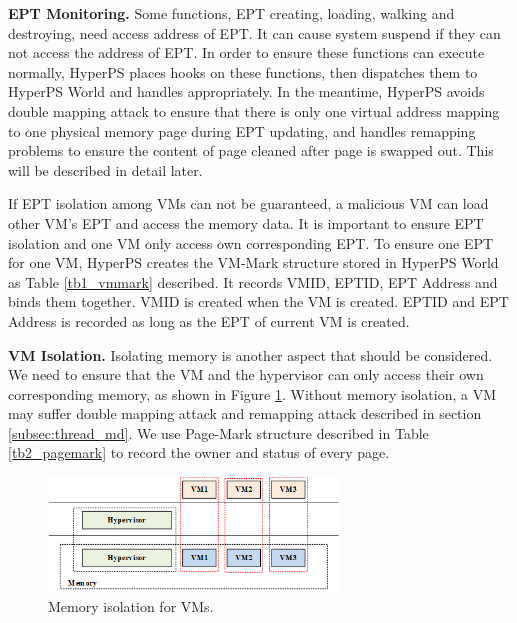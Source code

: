 \documentclass[10pt, numbers, preprint ]{sigplanconf}
\begin{document}
{\textbf{EPT Monitoring.} Some functions, EPT creating, loading, walking and destroying, need access address of EPT. It can cause system suspend if they can not access the address of EPT. In order to ensure these functions can execute normally, HyperPS places hooks on these functions, then dispatches them to HyperPS World and handles appropriately. In the meantime, HyperPS avoids double mapping attack to ensure that there is only one virtual address mapping to one physical memory page during EPT updating, and handles remapping problems to ensure the content of page cleaned after page is swapped out. This will be described in detail later.

If EPT isolation among VMs can not be guaranteed, a malicious VM can load other VM’s EPT and access the memory data. It is important to ensure EPT isolation and one VM only access own corresponding EPT. To ensure one EPT for one VM, HyperPS creates the VM-Mark structure stored in HyperPS World as Table \ref{tb1_vmmark} described. It records VMID, EPTID, EPT Address and binds them together. VMID is created when the VM is created. EPTID and EPT Address is recorded as long as the EPT of current VM is created.

\begin{table}[htbp]
	\centering
	\caption{vm-Mark Table.}
	\label{tb1_vmmark}
\end{table}

\textbf{VM Isolation.} Isolating memory is another aspect that should be considered. We need to ensure that the VM and the hypervisor can only access their own corresponding memory, as shown in Figure \ref{fg6_memiso}. Without memory isolation, a VM may suffer double mapping attack and remapping attack described in section \ref{subsec:thread_md}. We use Page-Mark structure described in Table \ref{tb2_pagemark} to record the owner and status of every page.

\begin{figure}[htbp]
	\centerline{\includegraphics[height=1.20in]{figures/p6.png}}
	\caption{Memory isolation for VMs.}
	\label{fg6_memiso}
\end{figure}

}
\end{document}
